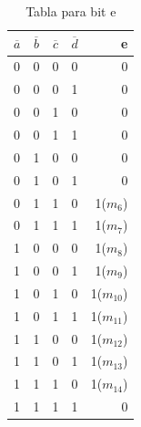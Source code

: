 \begin{table}[h!]
	\begin{center}
		\caption{Tabla para bit e}
		\vspace{5mm}
		\begin{tabular}{l|c|c|c|r}
			\textbf{$\overline{a}$} & \textbf{$\overline{b}$} & \textbf{$\overline{c}$} & \textbf{$\overline{d}$} & \textbf{e}  \\
			\hline
			0                       & 0                       & 0                       & 0                       & 0           \\
			0                       & 0                       & 0                       & 1                       & 0           \\	
			0                       & 0                       & 1                       & 0                       & 0           \\
			0                       & 0                       & 1                       & 1                       & 0           \\
			0                       & 1                       & 0                       & 0                       & 0           \\
			0                       & 1                       & 0                       & 1                       & 0           \\	
			0                       & 1                       & 1                       & 0                       & 1($m_{6}$)  \\
			0                       & 1                       & 1                       & 1                       & 1($m_{7}$)  \\		
			1                       & 0                       & 0                       & 0                       & 1($m_{8}$)  \\
			1                       & 0                       & 0                       & 1                       & 1($m_{9}$)  \\	
			1                       & 0                       & 1                       & 0                       & 1($m_{10}$) \\
			1                       & 0                       & 1                       & 1                       & 1($m_{11}$) \\
			1                       & 1                       & 0                       & 0                       & 1($m_{12}$) \\
			1                       & 1                       & 0                       & 1                       & 1($m_{13}$) \\	
			1                       & 1                       & 1                       & 0                       & 1($m_{14}$) \\
			1                       & 1                       & 1                       & 1                       & 0           \\			
		\end{tabular}
	\end{center}
\end{table}
